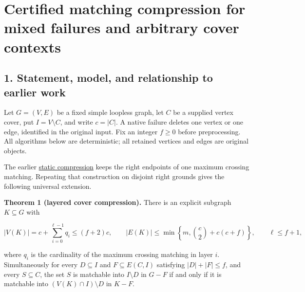 
\hypertarget{af-321c79486f-certified-matching-compression-for-mixed-failures-and-arbitrary-cover-contexts}{%
\section{Certified matching compression for mixed failures and arbitrary cover contexts}\label{af-321c79486f-certified-matching-compression-for-mixed-failures-and-arbitrary-cover-contexts}}

\hypertarget{af-321c79486f-statement-model-and-relationship-to-earlier-work}{%
\subsection{1. Statement, model, and relationship to earlier work}\label{af-321c79486f-statement-model-and-relationship-to-earlier-work}}

Let \(G=(V,E)\) be a fixed simple loopless graph, let \(C\) be a supplied vertex cover, put \(I=V\setminus C\), and write \(c=|C|\). A native failure deletes one vertex or one edge, identified in the original input. Fix an integer \(f\geq0\) before preprocessing. All algorithms below are deterministic; all retained vertices and edges are original objects.

The earlier \href{https://github.com/icekylinx/algorithm-frontier/blob/main/problems/general-matching/reference/cover-compression-proof.md}{static compression} keeps the right endpoints of one maximum crossing matching. Repeating that construction on disjoint right grounds gives the following universal extension.

\textbf{Theorem 1 (layered cover compression).} There is an explicit subgraph \(K\subseteq G\) with

\[
|V(K)|=c+\sum_{i=0}^{\ell-1}q_i\leq(f+2)c,
\qquad
|E(K)|\leq\min\left\{m,\binom c2+c(c+f)\right\},
\qquad \ell\leq f+1,
\]

where \(q_i\) is the cardinality of the maximum crossing matching in layer \(i\). Simultaneously for every \(D\subseteq I\) and \(F\subseteq E(C,I)\) satisfying \(|D|+|F|\leq f\), and every \(S\subseteq C\), the set \(S\) is matchable into \(I\setminus D\) in \(G-F\) if and only if it is matchable into \((V(K)\cap I)\setminus D\) in \(K-F\).

